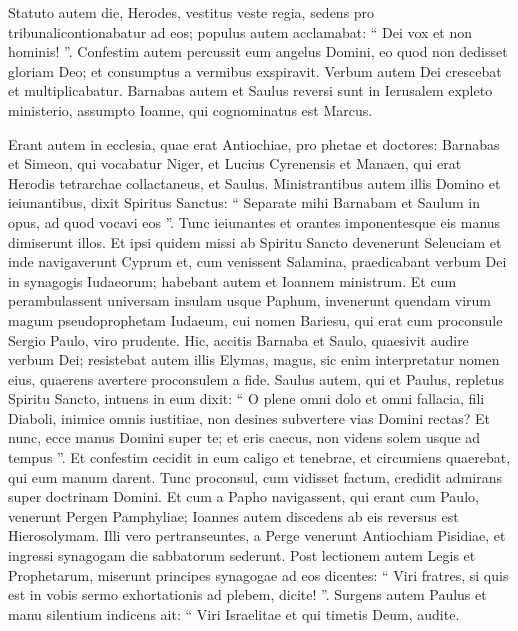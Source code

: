 \begin{biblechapter}
\begin{biblechapter}
\begin{biblechapter}
\begin{biblechapter}
\begin{biblechapter}
\begin{biblechapter}
\begin{biblechapter}
\begin{biblechapter}
\begin{biblechapter}
\begin{biblechapter}
\begin{biblechapter}
\begin{biblechapter}
\verse Statuto autem die, Herodes, vestitus veste regia, sedens pro tribunalicontionabatur ad eos; 
\verse populus autem acclamabat: “ Dei vox et non hominis! ”. 
\verse Confestim autem percussit eum angelus Domini, eo quod non dedisset gloriam Deo; et consumptus a vermibus exspiravit.
 \verse Verbum autem Dei crescebat et multiplicabatur. 
\verse Barnabas autem et Saulus reversi sunt in Ierusalem expleto ministerio, assumpto Ioanne, qui cognominatus est Marcus.
 
\begin{biblechapter}
\verse Erant autem in ecclesia, quae erat Antiochiae, pro phetae et doctores: Barnabas et Simeon, qui vocabatur Niger, et Lucius Cyrenensis et Manaen, qui erat Herodis tetrarchae collactaneus, et Saulus. 
\verse Ministrantibus autem illis Domino et ieiunantibus, dixit Spiritus Sanctus: “ Separate mihi Barnabam et Saulum in opus, ad quod vocavi eos ”. 
\verse Tunc ieiunantes et orantes imponentesque eis manus dimiserunt illos.
 \verse Et ipsi quidem missi ab Spiritu Sancto devenerunt Seleuciam et inde navigaverunt Cyprum 
\verse et, cum venissent Salamina, praedicabant verbum Dei in synagogis Iudaeorum; habebant autem et Ioannem ministrum. 
\verse Et cum perambulassent universam insulam usque Paphum, invenerunt quendam virum magum pseudoprophetam Iudaeum, cui nomen Bariesu, 
\verse qui erat cum proconsule Sergio Paulo, viro prudente. Hic, accitis Barnaba et Saulo, quaesivit audire verbum Dei; 
\verse resistebat autem illis Elymas, magus, sic enim interpretatur nomen eius, quaerens avertere proconsulem a fide. 
\verse Saulus autem, qui et Paulus, repletus Spiritu Sancto, intuens in eum 
\verse dixit: “ O plene omni dolo et omni fallacia, fili Diaboli, inimice omnis iustitiae, non desines subvertere vias Domini rectas? 
\verse Et nunc, ecce manus Domini super te; et eris caecus, non videns solem usque ad tempus ”. Et confestim cecidit in eum caligo et tenebrae, et circumiens quaerebat, qui eum manum darent. 
\verse Tunc proconsul, cum vidisset factum, credidit admirans super doctrinam Domini.
 \verse Et cum a Papho navigassent, qui erant cum Paulo, venerunt Pergen Pamphyliae; Ioannes autem discedens ab eis reversus est Hierosolymam. 
\verse Illi vero pertranseuntes, a Perge venerunt Antiochiam Pisidiae, et ingressi synagogam die sabbatorum sederunt. 
\verse Post lectionem autem Legis et Prophetarum, miserunt principes synagogae ad eos dicentes: “ Viri fratres, si quis est in vobis sermo exhortationis ad plebem, dicite! ”.
 \verse Surgens autem Paulus et manu silentium indicens ait: “ Viri Israelitae et qui timetis Deum, audite. 

\end{biblechapter}
\end{biblechapter}
\end{biblechapter}
\end{biblechapter}
\end{biblechapter}
\end{biblechapter}
\end{biblechapter}
\end{biblechapter}
\end{biblechapter}
\end{biblechapter}
\end{biblechapter}
\end{biblechapter}
\end{biblechapter}
